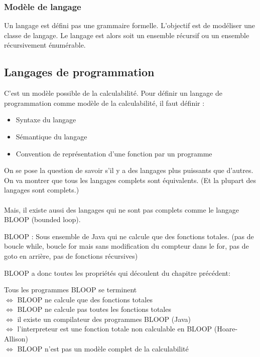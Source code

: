 \subsubsection{Modèle de langage}
\label{ssub:mod_le_de_langage}
Un langage est défini pas une grammaire formelle. L'objectif est de modéliser 
une classe de langage. Le langage est alors soit un ensemble récursif ou un 
ensemble récursivement énumérable.


\subsection{Langages de programmation}
\label{sub:langages_de_programmation}
C'est un modèle possible de la calculabilité. Pour définir un langage de 
programmation comme modèle de la calculabilité, il faut définir : 
\begin{itemize}
	\item Syntaxe du langage
	\item Sémantique du langage
	\item Convention de représentation d'une fonction par un programme
\end{itemize}

On se pose la question de savoir s'il y a des langages plus puissants que 
d'autres. On va montrer que tous les langages complets sont équivalents. (Et la 
plupart des langages sont complets.)

\paragraph{} Mais, il existe aussi des langages qui ne sont pas complets comme le 
langage BLOOP (bounded loop).

\begin{mydef}
	BLOOP : Sous ensemble de Java qui ne calcule que des fonctions totales. 
	(pas de boucle while, boucle for mais sans modification du compteur 
	dans le for, pas de goto en arrière, pas de fonctions récursives)
\end{mydef}

BLOOP a donc toutes les propriétés qui découlent du chapitre précédent:

\begin{myprop}
	Tous les programmes BLOOP se terminent\\
	$ \Leftrightarrow$ BLOOP ne calcule que des fonctions totales\\
	$ \Leftrightarrow$ BLOOP ne calcule pas toutes les fonctions totales\\
	$ \Leftrightarrow$ il existe un compilateur des programmes BLOOP (Java)\\
	$ \Leftrightarrow$ l'interpreteur est une fonction totale non calculable en
BLOOP (Hoare-Allison)\\
	$ \Leftrightarrow$ BLOOP n'est pas un modèle complet de la calculabilité\\
\end{myprop}

